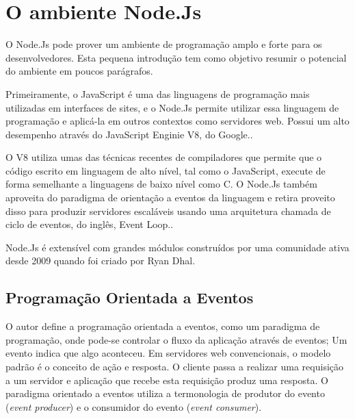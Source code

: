 \chapter{O ambiente Node.Js}
\label{ambiente-node-js}

\vspace{-1.9cm}


  O Node.Js pode prover um ambiente de programação amplo e forte para os desenvolvedores. Esta pequena introdução
  tem como objetivo resumir o potencial do ambiente em poucos parágrafos.
  
  
  Primeiramente, o JavaScript é uma das linguagens de programação mais utilizadas em interfaces de sites, e o Node.Js
  permite utilizar essa linguagem de programação e aplicá-la em outros contextos como servidores web. Possui um alto
  desempenho através do JavaScript Enginie V8, do Google.\cite{Hughes:2012}.
  
  O V8 utiliza umas das técnicas recentes de compiladores que permite que o código escrito em linguagem de alto nível,
  tal como o JavaScript, execute de forma semelhante a linguagens de baixo nível como C. O Node.Js também aproveita
  do paradigma de orientação a eventos da linguagem e retira proveito disso para produzir servidores escaláveis usando 
  uma arquitetura chamada de ciclo de eventos, do inglês, Event Loop.\cite{Hughes:2012}.
  
  Node.Js é extensível com grandes módulos construídos por uma comunidade ativa desde 2009 quando foi criado
  por Ryan Dhal.
  
\section{Programação Orientada a Eventos}
\label{programacao-orientada-a-eventos}

  O autor  define a programação orientada a eventos, como um paradigma de programação, onde
  pode-se controlar o fluxo da aplicação através de eventos; Um evento indica que algo aconteceu. 
  Em servidores web convencionais, o modelo padrão é o conceito de ação e resposta. 
  O cliente passa a realizar uma requisição a um servidor e aplicação que recebe esta requisição produz uma resposta. 
  O paradigma orientado a eventos utiliza a termonologia de produtor do evento (\textit{event producer}) 
  e o consumidor do evento (\textit{event consumer}).

